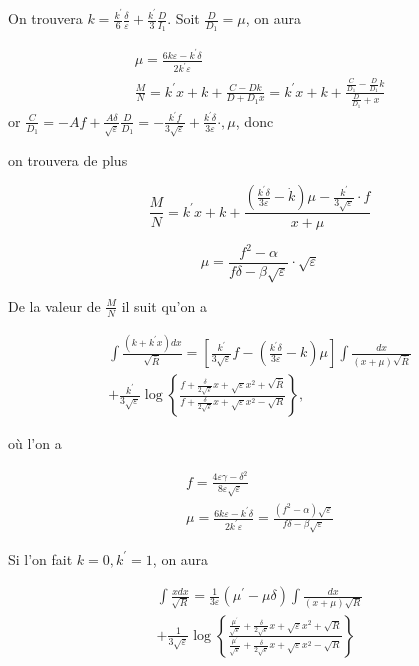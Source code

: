 \documentclass{article}
\begin{document}
On trouvera \(k=\frac{k^{\prime}}{6} \frac{\delta}{\varepsilon}+\frac{k^{\prime}}{3} \frac{D}{I_{1}}\). Soit \(\frac{D}{D_{1}}=\mu\), on aura

\[
\begin{gathered}
\mu=\frac{6 k \varepsilon-k^{\prime} \delta}{2 k^{\prime} \varepsilon} \\
\frac{M}{N}=k^{\prime} x+k+\frac{C-D k}{D+D_{1} x}=k^{\prime} x+k+\frac{\frac{C}{D_{1}}-\frac{D}{D_{1}} k}{\frac{D}{D_{1}}+x}
\end{gathered}
\]
or \(\frac{C}{D_{1}}=-A f+\frac{A \delta}{\sqrt{\varepsilon}} \frac{D}{D_{1}}=-\frac{k^{\prime} f}{3 \sqrt{\varepsilon}}+\frac{k^{\prime} \delta}{3 \varepsilon} \cdot, \mu\), donc

on trouvera de plus

\[
\frac{M}{N}=k^{\prime} x+k+\frac{\left(\frac{k^{\prime} \delta}{3 \varepsilon}-\dot{k}\right) \mu-\frac{k^{\prime}}{3 \sqrt{\varepsilon}} \cdot f}{x+\mu}
\]

\[
\mu=\frac{f^{2}-\alpha}{f \delta-\beta \sqrt{\varepsilon}} \cdot \sqrt{\varepsilon}
\]

De la valeur de \(\frac{M}{N}\) il suit qu'on a

\[
\begin{gathered}
\int \frac{\left(k+k^{\prime} x\right) d x}{\sqrt{\bar{R}}}=\left[\frac{k^{\prime}}{3 \sqrt{\varepsilon}} f-\left(\frac{k^{\prime} \delta}{3 \varepsilon}-k\right) \mu\right] \int \frac{d x}{(x+\mu) \sqrt{\bar{R}}} \\
+\frac{k^{\prime}}{3 \sqrt{\varepsilon}} \log \left\{\frac{f+\frac{\delta}{2 \sqrt{\varepsilon}} x+\sqrt{\varepsilon} x^{2}+\sqrt{\bar{R}}}{f+\frac{\delta}{2 \sqrt{\varepsilon}} x+\sqrt{\varepsilon} x^{2}-\sqrt{R}}\right\},
\end{gathered}
\]

où l'on a

\[
\begin{gathered}
f=\frac{4 \varepsilon \gamma-\delta^{2}}{8 \varepsilon \sqrt{\varepsilon}} \\
\mu=\frac{6 k \varepsilon-k^{\prime} \delta}{2 k^{\prime} \varepsilon}=\frac{\left(f^{2}-\alpha\right) \sqrt{\varepsilon}}{f \delta-\beta \sqrt{\varepsilon}}
\end{gathered}
\]

Si l'on fait \(k=0, k^{\prime}=1\), on aura

\[
\begin{gathered}
\int \frac{x d x}{\sqrt{R}}=\frac{1}{3 \varepsilon}\left(\mu^{\prime}-\mu \delta\right) \int \frac{d x}{(x+\mu) \sqrt{R}} \\
+\frac{1}{3 \sqrt{\varepsilon}} \log \left\{\frac{\frac{\mu^{\prime}}{\sqrt{\varepsilon}}+\frac{\delta}{2 \sqrt{\varepsilon}} x+\sqrt{\varepsilon} x^{2}+\sqrt{R}}{\frac{\mu^{\prime}}{\sqrt{\varepsilon}}+\frac{\delta}{2 \sqrt{\varepsilon}} x+\sqrt{\varepsilon} x^{2}-\sqrt{R}}\right\}
\end{gathered}
\]
\end{document}
